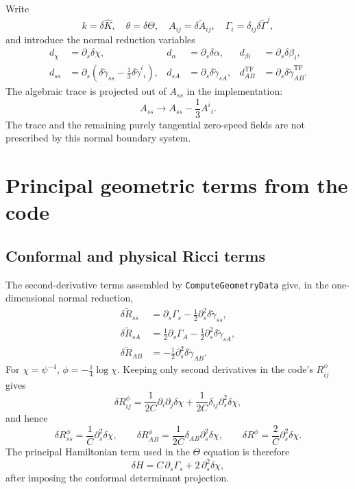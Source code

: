 \documentclass[11pt]{article}
\newcommand{\tf}{\mathrm{TF}}
\begin{document}
Write
\[
 k=\delta\hat K,\quad
 \theta=\delta\Theta,\quad
 A_{ij}=\delta\tilde A_{ij},\quad
 \Gamma_i=\delta_{ij}\delta\tilde\Gamma^j,
\]
and introduce the normal reduction variables
\begin{align}
 d_\chi&=\partial_s\delta\chi,&
 d_\alpha&=\partial_s\delta\alpha,&
 d_{\beta i}&=\partial_s\delta\beta_i,\\
 d_{ss}&=\partial_s\left(
    \delta\tilde\gamma_{ss}
    -\frac13\delta\tilde\gamma^i{}_i\right),&
 d_{sA}&=\partial_s\delta\tilde\gamma_{sA},&
 d_{AB}^{\tf}&=\partial_s\delta\tilde\gamma_{AB}^{\tf}.
\end{align}
The algebraic trace is projected out of \(A_{ss}\) in the implementation:
\[
 A_{ss}\longrightarrow
 A_{ss}-\frac13 A^i{}_i.
\]
The trace and the remaining purely tangential zero-speed fields are not
prescribed by this normal boundary system.

\section{Principal geometric terms from the code}

\subsection{Conformal and physical Ricci terms}

The second-derivative terms assembled by
\texttt{ComputeGeometryData} give, in the one-dimensional normal reduction,
\begin{align}
 \delta\tilde R_{ss}
   &=\partial_s\Gamma_s-\frac12\partial_s^2
       \delta\tilde\gamma_{ss},\\
 \delta\tilde R_{sA}
   &=\frac12\partial_s\Gamma_A-\frac12\partial_s^2
       \delta\tilde\gamma_{sA},\\
 \delta\tilde R_{AB}
   &=-\frac12\partial_s^2\delta\tilde\gamma_{AB}.
\end{align}
For \(\chi=\psi^{-4}\), \(\phi=-\tfrac14\log\chi\).  Keeping only
second derivatives in the code's \(R^\phi_{ij}\) gives
\[
 \delta R^\phi_{ij}
 =\frac{1}{2C}\partial_i\partial_j\delta\chi
  +\frac{1}{2C}\delta_{ij}\partial_s^2\delta\chi,
\]
and hence
\[
 \delta R^\phi_{ss}=\frac1C\partial_s^2\delta\chi,\qquad
 \delta R^\phi_{AB}=\frac{1}{2C}\delta_{AB}
                    \partial_s^2\delta\chi,\qquad
 \delta R^\phi=\frac2C\partial_s^2\delta\chi.
\]
The principal Hamiltonian term used in the \(\Theta\) equation is therefore
\[
 \delta H
 =C\,\partial_s\Gamma_s+2\,\partial_s^2\delta\chi,
 \label{eq:hamiltonian-principal}
\]
after imposing the conformal determinant projection.
\end{document}
